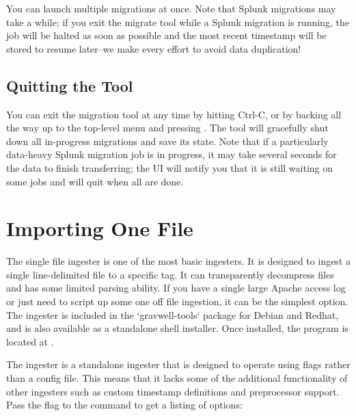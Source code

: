 You can launch multiple migrations at once. Note that Splunk migrations may take a while; if you exit the migrate tool while a Splunk migration is running, the job will be halted as soon as possible and the most recent timestamp will be stored to resume later--we make every effort to avoid data duplication!

\subsection{Quitting the Tool}

You can exit the migration tool at any time by hitting Ctrl-C, or by backing all the way up to the top-level menu and pressing . The tool will gracefully shut down all in-progress migrations and save its state. Note that if a particularly data-heavy Splunk migration job is in progress, it may take several seconds for the data to finish transferring; the UI will notify you that it is still waiting on some jobs and will quit when all are done.



\clearpage

\section{Importing One File}
The single file ingester is one of the most basic ingesters.  It is designed to ingest a single line-delimited file to a specific tag.  It can transparently decompress files and has some limited parsing ability.  If you have a single large Apache access log or just need to script up some one off file ingestion, it can be the simplest option. The ingester is included in the `gravwell-tools` package for Debian and Redhat, and is also available as a standalone shell installer. Once installed, the program is located at .

The ingester is a standalone ingester that is designed to operate using flags rather than a config file.  This means that it lacks some of the additional functionality of other ingesters such as custom timestamp definitions and preprocessor support.  Pass the  flag to the command to get a listing of options:

